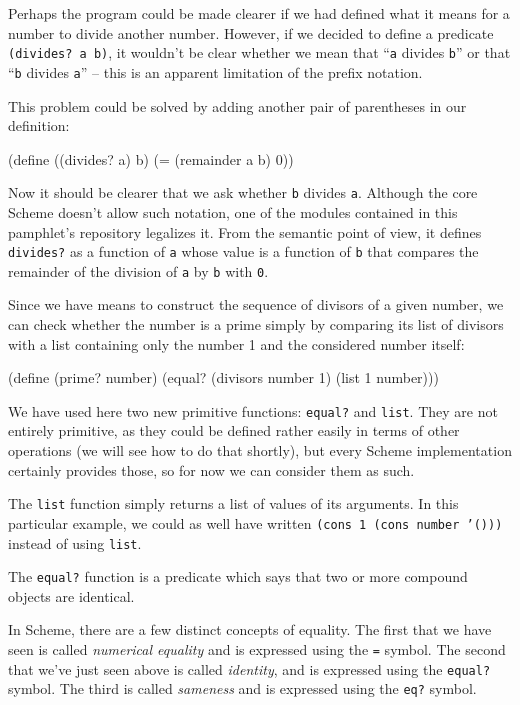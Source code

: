 Perhaps the program could be made clearer if we had defined what it
means for a number to divide another number. However, if we decided
to define a predicate \texttt{(divides? a b)}, it wouldn't be clear
whether we mean that ``\texttt{a} divides \texttt{b}'' or that
``\texttt{b} divides \texttt{a}'' -- this is an apparent limitation
of the prefix notation.

This problem could be solved by adding another pair of parentheses
in our definition:

\begin{Snippet}
(define ((divides? a) b)
  (= (remainder a b) 0))
\end{Snippet}

Now it should be clearer that we ask whether \texttt{b} divides
\texttt{a}.
Although the core Scheme doesn't allow such notation, one of
the modules contained in this pamphlet's repository legalizes
it. From the semantic point of view, it defines \texttt{divides?}
as a function of \texttt{a} whose value is a function of \texttt{b}
that compares the remainder of the division of \texttt{a} by
\texttt{b} with \texttt{0}.

Since we have means to construct the sequence of divisors of a given
number, we can check whether the number is a prime simply by comparing
its list of divisors with a list containing only the number 1 and
the considered number itself:

\begin{Snippet}
(define (prime? number)
  (equal? (divisors number 1) (list 1 number)))
\end{Snippet}

We have used here two new primitive functions: \texttt{equal?} and
\texttt{list}. They are not entirely primitive, as they could be
defined rather easily in terms of other operations (we will see how
to do that shortly), but every Scheme implementation certainly
provides those, so for now we can consider them as such.

The \texttt{list} function simply returns a list of values of
its arguments. In this particular example, we could as well have written
\texttt{(cons 1 (cons number '()))} instead of using \texttt{list}.

The \texttt{equal?} function is a predicate which says that two
or more compound objects are identical.

In Scheme, there are a few distinct concepts of equality. The first
that we have seen is called \textit{numerical equality} and is
expressed using the \texttt{=} symbol. The second that we've just
seen above is called \textit{identity}, and is expressed using
the \texttt{equal?} symbol.
The third is called \textit{sameness} and is expressed using
the \texttt{eq?} symbol.

